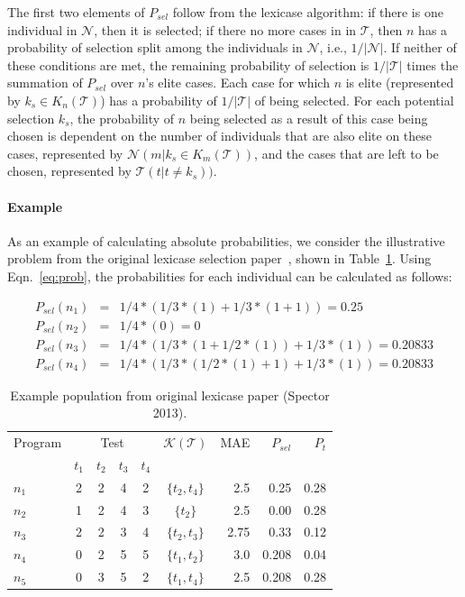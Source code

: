 \documentclass[preprint]{article}
\begin{document}
The first two elements of $P_{sel}$ follow from the lexicase algorithm: if there is one individual in $\mathcal{N}$, then it is selected; if there no more cases in in $\mathcal{T}$, then $n$ has a probability of selection split among the individuals in $\mathcal{N}$, i.e.,  $1/|\mathcal{N}|$. If neither of these conditions are met, the remaining probability of selection is $1/|\mathcal{T}|$ times the summation of $P_{sel}$ over $n$'s elite cases. Each case for which $n$ is elite (represented by $k_s \in K_n(\mathcal{T})$) has a probability of $1/|\mathcal{T}|$ of being selected. For each potential selection $k_s$, the probability of $n$ being selected as a result of this case being chosen is dependent on the number of individuals that are also elite on these cases, represented by $\mathcal{N}(m|k_s \in K_m(\mathcal{T}))$, and the cases that are left to be chosen, represented by $\mathcal{T}(t|t \neq k_s) )$. 

\paragraph{Example}
As an example of calculating absolute probabilities, we consider the illustrative problem from the original lexicase selection paper~\cite{spector_assessment_2013}, shown in Table~\ref{tbl:ex}. Using Eqn.~\ref{eq:prob}, the probabilities for each individual can be calculated as follows:

\begin{align*}
P_{sel}(n_1) &=& 1/4*(1/3*(1)+1/3*(1+1)) = 0.25 \\
P_{sel}(n_2) &=& 1/4*(0) = 0 \\
P_{sel}(n_3) &=&1/4*(1/3*(1+1/2*(1))+1/3*(1)) = 0.20833 \\
P_{sel}(n_4) &=& 1/4*(1/3*(1/2*(1)+1)+1/3*(1)) = 0.20833 
\end{align*}

\begin{table}
\centering
\caption{Example population from original lexicase paper (Spector 2013).}\label{tbl:ex}
\begin{tabular}{l|cccc|c|r|rr}
Program & \multicolumn{4}{c}{Test} & $\mathcal{K}(\mathcal{T})$ & MAE & $P_{sel}$ & $P_{t}$\\
& $t_1$ & $t_2$ & $t_3$ & $t_4$ & \\ \hline
$n_1$ & 2 & 2 & 4 & 2 & $\{t_2,t_4\}$ &	2.5		&	0.25 	& 	0.28	\\
$n_2$ & 1 & 2 & 4 & 3 & $\{t_2\}$		&	2.5		&	0.00	&	0.28	\\
$n_3$ & 2 & 2 & 3 & 4 & $\{t_2,t_3\}$ &	2.75	& 	0.33	&	0.12	\\
$n_4$ & 0 & 2 & 5 & 5 & $\{t_1,t_2\}$ &	3.0		& 	0.208	&	0.04	\\
$n_5$ & 0 & 3 & 5 & 2 & $\{t_1,t_4\}$ &	2.5		&	0.208	&	0.28
\end{tabular}
\end{table}
\end{document}
